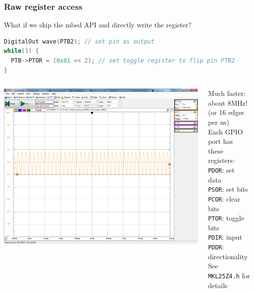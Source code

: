 \documentclass{beamer}
\begin{document}
\begin{frame}[fragile]
\frametitle{Raw register access}
What if we skip the mbed API and directly write the register?
\vspace{2px}
\begin{lstlisting}[language=C++,basicstyle=\ttfamily\tiny]
DigitalOut wave(PTB2); // set pin as output
while(1) {
  PTB->PTOR = (0x01 << 2); // set toggle register to flip pin PTB2
}
\end{lstlisting}
\begin{columns}[T]
\includegraphics[width=1.0\columnwidth]{images-dis10/gpio_register_ptb_ptor}

Much faster: about 8MHz! \\
(or 16 edges per us) \\
\vspace{10px}
{\scriptsize Each GPIO port has these registers: \\
\texttt{PDOR}: set data \\
\texttt{PSOR}: set bits \\
\texttt{PCOR}: clear bits \\
\texttt{PTOR}: toggle bits \\
\texttt{PDIR}: input \\
\texttt{PDDR}: directionality \\
See \texttt{MKL25Z4.h} for details
}
\end{columns}
\end{frame}

\end{document}
